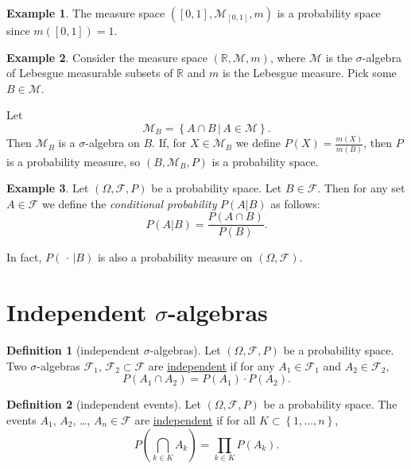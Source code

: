 \documentclass[a4paper,12pt]{scrreprt}
\newcommand{\R}{\mathbb{R}}
\newcommand{\defn}[1]{\ul{#1}}
\theoremstyle{definition}
\newtheorem{definition}{Definition}[section]
\newtheorem{example}{Example}[section]
\theoremstyle{plain}
\theoremstyle{remark}
\begin{document}
\begin{example}
  The measure space $\left( [0, 1], \mathcal{M}_{[0, 1]}, m \right)$ is a probability space since $m([0, 1]) = 1$.
\end{example}

\begin{example}
  Consider the measure space $(\R, \mathcal{M}, m)$, where $\mathcal{M}$ is the $\sigma$-algebra of Lebesgue measurable subsets of $\R$ and $m$ is the Lebesgue measure. Pick some $B \in \mathcal{M}$.

  Let
  \begin{equation*}
    \mathcal{M}_{B} = \left\{ A \cap B\,\big|\, A \in \mathcal{M} \right\}.
  \end{equation*}
  Then $\mathcal{M}_{B}$ is a $\sigma$-algebra on $B$. If, for $X \in \mathcal{M}_{B}$ we define $P(X) = \frac{m(X)}{m(B)}$, then $P$ is a probability measure, so $(B, \mathcal{M}_{B}, P)$ is a probability space.
\end{example}

\begin{example}
  Let $(\Omega, \mathcal{F}, P)$ be a probability space. Let $B \in \mathcal{F}$. Then for any set $A \in \mathcal{F}$ we define the \emph{conditional probability} $P(A | B)$ as follows:
  \begin{equation*}
    P(A | B) = \frac{P(A \cap B)}{P(B)}.
  \end{equation*}

  In fact, $P(\,\cdot\,|B)$ is also a probability measure on $(\Omega, \mathcal{F})$.
\end{example}

\section{Independent \texorpdfstring{$\sigma$}{Lg}-algebras}

\begin{definition}[independent $\sigma$-algebras]
  \label{def:independentsigmaalgebra}
  Let $(\Omega, \mathcal{F}, P)$ be a probability space. Two $\sigma$-algebras $\mathcal{F}_{1}$, $\mathcal{F}_{2} \subset \mathcal{F}$ are \defn{independent} if for any $A_{1} \in \mathcal{F}_{1}$ and $A_{2} \in \mathcal{F}_{2}$,
  \begin{equation*}
    P(A_{1} \cap A_{2}) = P(A_{1}) \cdot P(A_{2}).
  \end{equation*}
\end{definition}

\begin{definition}[independent events]
  \label{def:independentevents}
  Let $(\Omega, \mathcal{F}, P)$ be a probability space. The events $A_{1}$, $A_{2}$, \dots, $A_{n} \in \mathcal{F}$ are \defn{independent} if for all $K \subset \left\{ 1,\ldots, n \right\}$,
  \begin{equation*}
    P\left( \bigcap_{k \in K} A_{k} \right) = \prod_{k \in K} P(A_{k}).
  \end{equation*}
\end{definition}
\end{document}
